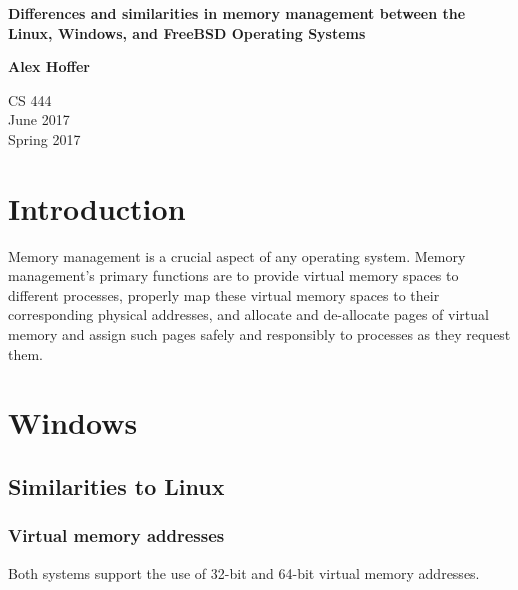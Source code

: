 \documentclass[letterpaper,10pt,draftclsnofoot,onecolumn,titlepage]{IEEEtran}
\begin{document}
\begin{titlepage}
    \begin{center}
        \vspace*{3.5cm}

        \textbf{Differences and similarities in memory management between the Linux, Windows, and FreeBSD Operating Systems}

        \vspace{0.5cm}

        \textbf{Alex Hoffer}

        \vspace{0.8cm}

        CS 444\\
        June 2017\\
	Spring 2017\\

        \vfill

    \end{center}
\end{titlepage}

\newpage

\tableofcontents

\newpage

\section{Introduction}
Memory management is a crucial aspect of any operating system. Memory management's primary functions are to provide virtual memory spaces to different processes, properly map these virtual memory spaces to their corresponding physical addresses, and allocate and de-allocate pages of virtual memory and assign such pages safely and responsibly to processes as they request them.

\section{Windows}
\subsection{Similarities to Linux}
\subsubsection{Virtual memory addresses}
Both systems support the use of 32-bit and 64-bit virtual memory addresses. \cite{windows1} \cite{linux1}
\end{document}
